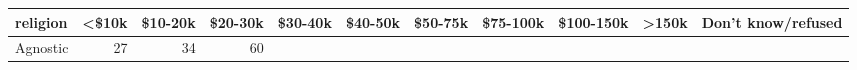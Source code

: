 \documentclass[]{article}
\begin{document}
\begin{longtable}[]{@{}lrrrrrrrrrr@{}}
\toprule
\begin{minipage}[b]{0.14\columnwidth}\raggedright\strut
religion\strut
\end{minipage} & \begin{minipage}[b]{0.04\columnwidth}\raggedleft\strut
\textless{}\$10k\strut
\end{minipage} & \begin{minipage}[b]{0.05\columnwidth}\raggedleft\strut
\$10-20k\strut
\end{minipage} & \begin{minipage}[b]{0.05\columnwidth}\raggedleft\strut
\$20-30k\strut
\end{minipage} & \begin{minipage}[b]{0.05\columnwidth}\raggedleft\strut
\$30-40k\strut
\end{minipage} & \begin{minipage}[b]{0.05\columnwidth}\raggedleft\strut
\$40-50k\strut
\end{minipage} & \begin{minipage}[b]{0.05\columnwidth}\raggedleft\strut
\$50-75k\strut
\end{minipage} & \begin{minipage}[b]{0.06\columnwidth}\raggedleft\strut
\$75-100k\strut
\end{minipage} & \begin{minipage}[b]{0.06\columnwidth}\raggedleft\strut
\$100-150k\strut
\end{minipage} & \begin{minipage}[b]{0.04\columnwidth}\raggedleft\strut
\textgreater{}150k\strut
\end{minipage} & \begin{minipage}[b]{0.11\columnwidth}\raggedleft\strut
Don't know/refused\strut
\end{minipage}\tabularnewline
\midrule
\endhead
\begin{minipage}[t]{0.14\columnwidth}\raggedright\strut
Agnostic\strut
\end{minipage} & \begin{minipage}[t]{0.04\columnwidth}\raggedleft\strut
27\strut
\end{minipage} & \begin{minipage}[t]{0.05\columnwidth}\raggedleft\strut
34\strut
\end{minipage} & \begin{minipage}[t]{0.05\columnwidth}\raggedleft\strut
60\strut
\end{minipage} & \begin{minipage}[t]{0.05\columnwidth}\raggedleft\strut

\end{minipage}
\end{longtable}
\end{document}
